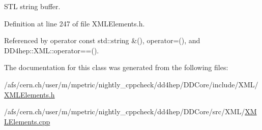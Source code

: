 STL string buffer. 

Definition at line 247 of file XMLElements.h.

Referenced by operator const std::string \&(), operator=(), and DD4hep::XML::operator==().

The documentation for this class was generated from the following files:\begin{DoxyCompactItemize}
\item 
/afs/cern.ch/user/m/mpetric/nightly\_\-cppcheck/dd4hep/DDCore/include/XML/\hyperlink{_x_m_l_elements_8h}{XMLElements.h}\item 
/afs/cern.ch/user/m/mpetric/nightly\_\-cppcheck/dd4hep/DDCore/src/XML/\hyperlink{_x_m_l_elements_8cpp}{XMLElements.cpp}\end{DoxyCompactItemize}
